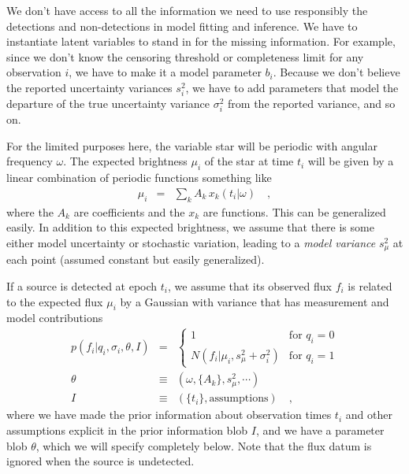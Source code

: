 \documentclass[12pt,preprint]{aastex}
\begin{document}
We don't have access to all the information we need to use responsibly
the detections and non-detections in model fitting and inference.  We
have to instantiate latent variables to stand in for the missing
information.  For example, since we don't know the censoring threshold
or completeness limit for any observation $i$, we have to make it a
model parameter $b_i$.  Because we don't believe the reported
uncertainty variances $s_i^2$, we have to add parameters that model
the departure of the true uncertainty variance $\sigma_i^2$ from the
reported variance, and so on.

For the limited purposes here, the variable star will be periodic with
angular frequency $\omega$.  The expected brightness $\mu_i$ of the
star at time $t_i$ will be given by a linear combination of periodic
functions something like
\begin{eqnarray}\displaystyle
\mu_i &=& \sum_k A_k\,x_k(t_i|\omega)
\quad ,
\end{eqnarray}
where the $A_k$ are coefficients and the $x_k$ are functions.  This
can be generalized easily.  In addition to this expected brightness,
we assume that there is some either model uncertainty or stochastic
variation, leading to a \emph{model variance} $s_\mu^2$ at each point
(assumed constant but easily generalized).

If a source is detected at epoch $t_i$, we assume that its observed
flux $f_i$ is related to the expected flux $\mu_i$ by a Gaussian with
variance that has measurement and model contributions
\begin{eqnarray}\displaystyle
p(f_i|q_i,\sigma_i,\theta,I) &=& \left\{\begin{array}{ll}
  1 & \mbox{for $q_i=0$} \\
  N(f_i|\mu_i,s_\mu^2+\sigma_i^2) & \mbox{for $q_i=1$}
\end{array}\right.\label{eq:poff}
\\
\theta &\equiv& (\omega, \{A_k\}, s_\mu^2, \cdots)
\\
I &\equiv& (\{t_i\}, \mbox{assumptions})
\quad ,
\end{eqnarray}
where we have made the prior information about observation times $t_i$
and other assumptions explicit in the prior information blob $I$, and
we have a parameter blob $\theta$, which we will specify completely
below.  Note that the flux datum is ignored when the source is
undetected.
\end{document}
